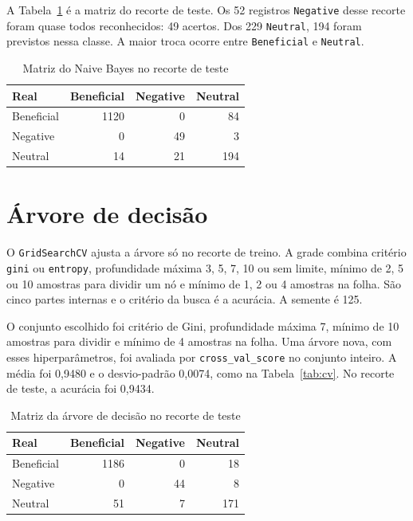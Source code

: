 \documentclass[
  article,
  12pt,
  oneside,
  a4paper,
  english,
  brazil,
  chapter=TITLE,
  section=TITLE,
  subsection=TITLE
]{abntex2}
\begin{document}
A Tabela~\ref{tab:nb} é a matriz do recorte de teste. Os 52 registros \texttt{Negative} desse recorte foram quase todos reconhecidos: 49 acertos. Dos 229 \texttt{Neutral}, 194 foram previstos nessa classe. A maior troca ocorre entre \texttt{Beneficial} e \texttt{Neutral}.

\begin{table}[htb]
  \centering
  \caption{Matriz do Naive Bayes no recorte de teste}
  \label{tab:nb}
  \begin{tabular}{lrrr}
    \toprule
    Real & Beneficial & Negative & Neutral \\
    \midrule
    Beneficial & 1120 & 0 & 84 \\
    Negative & 0 & 49 & 3 \\
    Neutral & 14 & 21 & 194 \\
    \bottomrule
  \end{tabular}
\end{table}

\section{Árvore de decisão}

O \texttt{GridSearchCV} ajusta a árvore só no recorte de treino. A grade combina critério \texttt{gini} ou \texttt{entropy}, profundidade máxima 3, 5, 7, 10 ou sem limite, mínimo de 2, 5 ou 10 amostras para dividir um nó e mínimo de 1, 2 ou 4 amostras na folha. São cinco partes internas e o critério da busca é a acurácia. A semente é 125.

O conjunto escolhido foi critério de Gini, profundidade máxima 7, mínimo de 10 amostras para dividir e mínimo de 4 amostras na folha. Uma árvore nova, com esses hiperparâmetros, foi avaliada por \texttt{cross\_val\_score} no conjunto inteiro. A média foi 0,9480 e o desvio-padrão 0,0074, como na Tabela~\ref{tab:cv}. No recorte de teste, a acurácia foi 0,9434.

\begin{table}[htb]
  \centering
  \caption{Matriz da árvore de decisão no recorte de teste}
  \label{tab:tree}
  \begin{tabular}{lrrr}
    \toprule
    Real & Beneficial & Negative & Neutral \\
    \midrule
    Beneficial & 1186 & 0 & 18 \\
    Negative & 0 & 44 & 8 \\
    Neutral & 51 & 7 & 171 \\
    \bottomrule
  \end{tabular}
\end{table}
\end{document}
